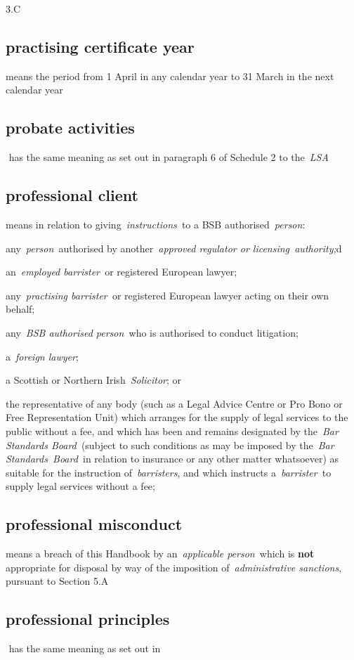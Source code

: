   3.C  \subsection{practising certificate year } means the period from 1 April
  in any calendar year to 31 March in the next calendar year  \subsection{probate activities } has the same meaning as set out in
  paragraph 6 of Schedule 2 to the~\emph{LSA} \subsection{professional client } means in relation to
  giving~\emph{instructions~}to a BSB authorised~\emph{person}: \al \item any~\emph{person~}authorised by another~\emph{approved regulator or
  licensing~authority;}d \item an~\emph{employed barrister~}or registered
  European lawyer; \item any~\emph{practising barrister~}or registered
  European lawyer acting on their own behalf; \item any~\emph{BSB
  authorised person~}who is authorised to conduct litigation; \item
  a~\emph{foreign lawyer}; \item a Scottish or Northern
  Irish~\emph{Solicitor}; or \item the representative of any body (such as
  a Legal Advice Centre or Pro Bono or Free Representation Unit) which
  arranges for the supply of legal services to the public without a fee,
  and which has been and remains designated by the~\emph{Bar Standards
  Board~}(subject to such conditions as may be imposed by the~\emph{Bar
  Standards~Board~}in relation to insurance or any other matter
  whatsoever) as suitable for the instruction of~\emph{barristers}, and
  which instructs a~\emph{barrister}~to supply legal services without a
  fee;\la  \subsection{professional misconduct } means a breach of this Handbook by
  an~\emph{applicable person~}which is \textbf{not} appropriate for disposal by
  way of the imposition of~\emph{administrative sanctions}, pursuant to
  Section 5.A  \subsection{professional principles } has the same meaning as set out in
